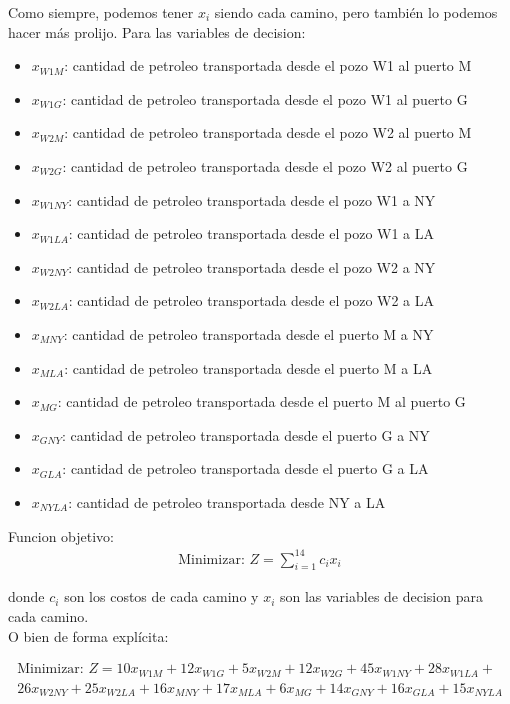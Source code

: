 \documentclass[12pt]{article}
\begin{document}
Como siempre, podemos tener $x_i$ siendo cada camino, pero también lo podemos hacer más prolijo. Para las variables de decision:
\begin{itemize}
    \item $x_{W1M}$: cantidad de petroleo transportada desde el pozo W1 al puerto M
    \item $x_{W1G}$: cantidad de petroleo transportada desde el pozo W1 al puerto G
    \item $x_{W2M}$: cantidad de petroleo transportada desde el pozo W2 al puerto M
    \item $x_{W2G}$: cantidad de petroleo transportada desde el pozo W2 al puerto G
    \item $x_{W1NY}$: cantidad de petroleo transportada desde el pozo W1 a NY
    \item $x_{W1LA}$: cantidad de petroleo transportada desde el pozo W1 a LA
    \item $x_{W2NY}$: cantidad de petroleo transportada desde el pozo W2 a NY
    \item $x_{W2LA}$: cantidad de petroleo transportada desde el pozo W2 a LA
    \item $x_{MNY}$: cantidad de petroleo transportada desde el puerto M a NY
    \item $x_{MLA}$: cantidad de petroleo transportada desde el puerto M a LA
    \item $x_{MG}$: cantidad de petroleo transportada desde el puerto M al puerto G
    \item $x_{GNY}$: cantidad de petroleo transportada desde el puerto G a NY
    \item $x_{GLA}$: cantidad de petroleo transportada desde el puerto G a LA
    \item $x_{NYLA}$: cantidad de petroleo transportada desde NY a LA
\end{itemize}

\vspace{1em}

Funcion objetivo:
\begin{align*}
\text{Minimizar: } Z = \sum_{i=1}^{14} c_ix_i
\end{align*}

donde $c_i$ son los costos de cada camino y $x_i$ son las variables de decision para cada camino. \\

O bien de forma explícita:

\begin{align*}
\text{Minimizar: } Z = 10x_{W1M} + 12x_{W1G} + 5x_{W2M} + 12x_{W2G} + 45x_{W1NY} + 28x_{W1LA} + \\ 26x_{W2NY} + 25x_{W2LA} + 16x_{MNY} + 17x_{MLA} + 6x_{MG} + 14x_{GNY} + 16x_{GLA} + 15x_{NYLA}
\end{align*}
\end{document}

